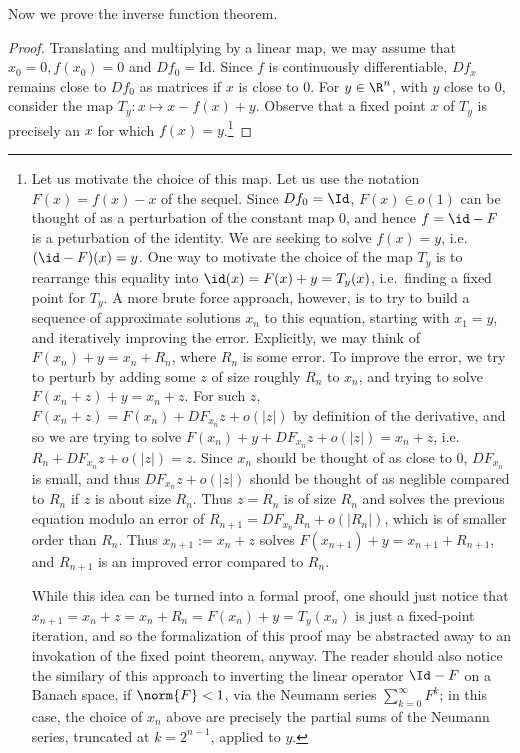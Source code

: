 \documentclass[12pt]{article}
\begin{document}
Now we prove the inverse function theorem.
\begin{proof}Translating and multiplying by a linear map, we may assume that $x_0 = 0, f(x_0) = 0$ and $Df_0 = \text{Id}$. Since $f$ is continuously differentiable, $Df_x$ remains close to $Df_0$ as matrices if $x$ is close to $0$. For $y \in \R^n$, with $y$ close to $0$, consider the map $T_y:x \mapsto x-f(x)+y$. Observe that a fixed point $x$ of $T_y$ is precisely an $x$ for which $f(x) = y$.\footnote{Let us motivate the choice of this map. Let us use the notation $F(x) = f(x)-x$ of the sequel. Since $Df_0 = \Id$, $F(x) \in o(1)$ can be thought of as a perturbation of the constant map $0$, and hence $f = \id - F$ is a peturbation of the identity. We are seeking to solve $f(x) = y$, i.e. $(\id - F)(x) = y$. One way to motivate the choice of the map $T_y$ is to rearrange this equality into $\id(x) = F(x)+y = T_y(x)$, i.e.\ finding a fixed point for $T_y$. A more brute force approach, however, is to try to build a sequence of approximate solutions $x_n$ to this equation, starting with $x_1 = y$, and iteratively improving the error. Explicitly, we may think of $F(x_n) + y = x_n + R_n$, where $R_n$ is some error. To improve the error, we try to perturb by adding some $z$ of size roughly $R_n$ to $x_n$, and trying to solve $F(x_n+z)+y = x_n+z$. For such $z$, $F(x_n+z) = F(x_n) + DF_{x_n}z + o(|z|)$ by definition of the derivative, and so we are trying to solve
$F(x_n)+y+DF_{x_n}z + o(|z|) = x_n+z$, i.e.\ $R_n  + DF_{x_n}z + o(|z|) = z$. Since $x_n$ should be thought of as close to $0$, $DF_{x_n}$ is small, and thus $DF_{x_n}z + o(|z|)$ should be thought of as neglible compared to $R_n$ if $z$ is about size $R_n$. Thus $z = R_n$ is of size $R_n$ and solves the previous equation modulo an error of $R_{n+1} = DF_{x_n}R_{n} + o(|R_n|)$, which is of smaller order than $R_n$. Thus $x_{n+1} := x_n + z$ solves $F(x_{n+1})+y = x_{n+1} + R_{n+1}$, and $R_{n+1}$ is an improved error compared to $R_n$.

While this idea can be turned into a formal proof, one should just notice that $x_{n+1} = x_n + z = x_n + R_n = F(x_n) + y = T_y(x_n)$ is just a fixed-point iteration, and so the formalization of this proof may be abstracted away to an invokation of the fixed point theorem, anyway. The reader should also notice the similary of this approach to inverting the linear operator $\Id-F$ on a Banach space, if $\norm{F} < 1$, via the Neumann series $\sum_{k=0}^{\infty} F^k$; in this case, the choice of $x_n$ above are precisely the partial sums of the Neumann series, truncated at $k = 2^{n-1}$, applied to $y$.}


\end{proof}
\end{document}
